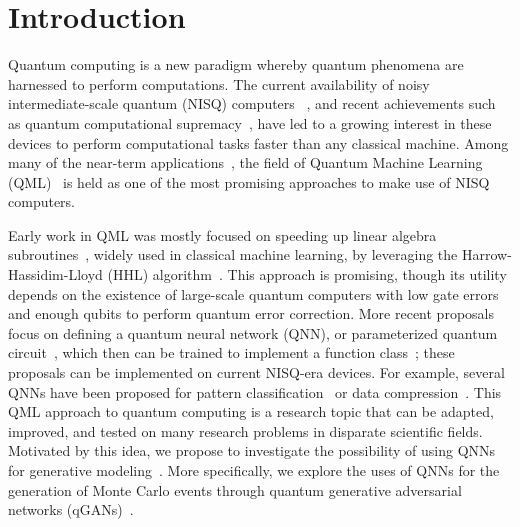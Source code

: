 \documentclass[twocolumn,preprintnumbers,superscriptaddress]{revtex4-2}
\begin{document}
\maketitle

\section{Introduction}

Quantum computing is a new paradigm whereby quantum phenomena are harnessed to perform computations. The current availability of noisy intermediate-scale quantum (NISQ) computers ~\cite{nisq}, and recent achievements such as quantum computational supremacy~\cite{supremacy, zhong2020quantum}, have led to a growing interest in these devices to perform computational tasks faster than any classical machine. Among many of the near-term applications~\cite{cerezo2021variational, bharti2021noisy}, the field of Quantum Machine Learning (QML)~\cite{biamonte2017quantum, schuld2018supervised} is held as one of the most promising approaches to make use of NISQ computers.

Early work in QML was mostly focused on speeding up linear algebra subroutines~\cite{wiebe2012quantum, lloyd:2013ml, Rebentrost:2014svm, kerenidis2020quantum}, widely used in classical machine learning, by leveraging the Harrow-Hassidim-Lloyd (HHL) algorithm~\cite{harrow2009quantum}. This approach is promising, though its utility depends on the existence of large-scale quantum computers with low gate errors and enough qubits to perform quantum error correction. More recent proposals focus on defining a quantum neural network (QNN), or parameterized quantum circuit~\cite{benedetti2019parameterized, sim2019expressibility, bravo2020scaling, larocca2021theory}, which then can be trained to implement a function class~\cite{schuld2021effect, goto2021universal, perez2021one}; these proposals can be implemented on current NISQ-era devices. For example, several QNNs have been proposed for pattern classification~\cite{havlivcek2019supervised, Schuld:2020circuit, perezsalinas:2020reuploading, dutta2021realization} or data compression~\cite{romero2017quantum, pepper2019experimental, bravo2021quantum, cao2021noise}. This QML approach to quantum computing is a research topic that can be adapted, improved, and tested on many research problems in disparate scientific fields. Motivated by this idea, we propose to investigate the possibility of using QNNs for generative modeling~\cite{benedetti2019generative, hamilton2019generative, coyle2020born}. More specifically, we explore the uses of QNNs for the generation of Monte Carlo events through quantum generative adversarial networks (qGANs)~\cite{dallaire2018quantum, lloyd2018quantum}.
\end{document}
